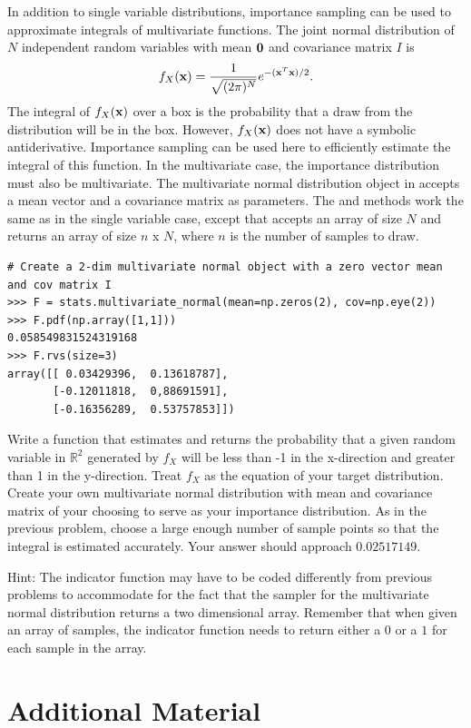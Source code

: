 In addition to single variable distributions, importance sampling can be used to approximate integrals of multivariate functions.
The joint normal distribution of $N$ independent random variables with mean $\mathbf{0}$ and covariance matrix $I$ is
\[
f_X(\mathbf{x}) = \frac{1}{\sqrt{(2 \pi)^N}} e^{-(\mathbf{x}^T\mathbf{x})/2}.
\]
The integral of $f_X(\mathbf{x})$ over a box is the probability that a draw from the distribution will be in the box.
However, $f_X(\mathbf{x})$ does not have a symbolic antiderivative.
Importance sampling can be used here to efficiently estimate the integral of this function.
In the multivariate case, the importance distribution must also be multivariate.
The multivariate normal distribution object in  accepts a mean vector and a covariance matrix as parameters.
The  and  methods work the same as in the single variable case, except that  accepts an array of size $N$ and  returns an array of size $n$ x $N$, where $n$ is the number of samples to draw.
\begin{lstlisting}
# Create a 2-dim multivariate normal object with a zero vector mean and cov matrix I
>>> F = stats.multivariate_normal(mean=np.zeros(2), cov=np.eye(2))
>>> F.pdf(np.array([1,1]))
0.058549831524319168
>>> F.rvs(size=3)
array([[ 0.03429396,  0.13618787],
       [-0.12011818,  0,88691591],
       [-0.16356289,  0.53757853]])
\end{lstlisting}

\begin{problem}
Write a function that estimates and returns the probability that a given random variable in $\mathbb{R}^2$ generated by $f_X$ will be less than -1 in the x-direction and greater than 1 in the y-direction.
Treat $f_X$ as the equation of your target distribution.
Create your own multivariate normal distribution with mean and covariance matrix of your choosing to serve as your importance distribution.
As in the previous problem, choose a large enough number of sample points so that the integral is estimated accurately.
Your answer should approach $0.02517149$.

Hint: The indicator function may have to be coded differently from previous problems to accommodate for the fact that the sampler for the multivariate normal distribution returns a two dimensional array.
Remember that when given an array of samples, the indicator function needs to return either a $0$ or a $1$ for each sample in the array.
\end{problem}

\newpage
\section*{Additional Material}


